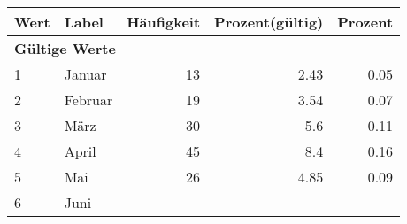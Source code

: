      \begin{longtable}{lXrrr}
     \toprule
     \textbf{Wert} & \textbf{Label} & \textbf{Häufigkeit} & \textbf{Prozent(gültig)} & \textbf{Prozent} \\
     \endhead
     \midrule
     \multicolumn{5}{l}{\textbf{Gültige Werte}}\\

     1 &
     \multicolumn{1}{X}{ Januar   } &


       \num{13} &
       \num[round-mode=places,round-precision=2]{2,43} &
         \num[round-mode=places,round-precision=2]{0,05} \\

     2 &
     \multicolumn{1}{X}{ Februar   } &


       \num{19} &
       \num[round-mode=places,round-precision=2]{3,54} &
         \num[round-mode=places,round-precision=2]{0,07} \\

     3 &
     \multicolumn{1}{X}{ März   } &


       \num{30} &
       \num[round-mode=places,round-precision=2]{5,6} &
         \num[round-mode=places,round-precision=2]{0,11} \\

     4 &
     \multicolumn{1}{X}{ April   } &


       \num{45} &
       \num[round-mode=places,round-precision=2]{8,4} &
         \num[round-mode=places,round-precision=2]{0,16} \\

     5 &
     \multicolumn{1}{X}{ Mai   } &


       \num{26} &
       \num[round-mode=places,round-precision=2]{4,85} &
         \num[round-mode=places,round-precision=2]{0,09} \\

     6 &
     \multicolumn{1}{X}{ Juni   } &



\end{longtable}
